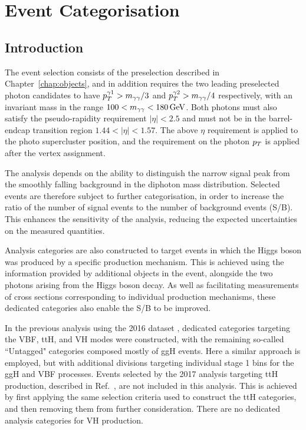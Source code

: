 \chapter{Event Categorisation}
\label{chap:categorisation}

\section{Introduction}

The event selection consists of the preselection described in Chapter~\ref{chap:objects}, 
and in addition requires the two leading preselected photon candidates to have 
$p_T^{\gamma 1} > m_{\gamma\gamma}/3$ and $p_T^{\gamma 2} > m_{\gamma\gamma} /4$ respectively, 
with an invariant mass in the range $100 < m_{\gamma\gamma} < \SI{180}{GeV}$.
Both photons must also satisfy the
pseudo-rapidity requirement $|\eta|<2.5$ and must not be in the barrel-endcap
transition region $1.44 < |\eta| < 1.57$.
The above $\eta$ requirement is applied to the photo supercluster
position, and the requirement on the photon $p_T$ is applied 
after the vertex assignment.

The \Hgg analysis depends on the ability to distinguish the narrow signal peak 
from the smoothly falling background in the diphoton mass distribution.
Selected events are therefore subject to further categorisation, in order to 
increase the ratio of the number of signal events to the number of background events (S/B).
This enhances the sensitivity of the analysis, 
reducing the expected uncertainties on the measured quantities.

Analysis categories are also constructed to target events in which the Higgs boson was 
produced by a specific production mechanism. 
This is achieved using the information provided by additional objects in the event, 
alongside the two photons arising from the Higgs boson decay.
As well as facilitating measurements of cross sections corresponding 
to individual production mechanisms, these dedicated categories also enable the S/B to be improved.

In the previous \Hgg analysis using the 2016 dataset \cite{HIG-16-040}, 
dedicated categories targeting the VBF, ttH, and VH modes were constructed, 
with the remaining so-called ``Untagged" categories composed mostly of ggH events.
Here a similar approach is employed, 
but with additional divisions targeting individual stage 1 bins for the ggH and VBF processes.
Events selected by the 2017 \Hgg analysis targeting ttH production, 
described in Ref.~\cite{HIG-18-018}, are not included in this analysis. 
This is achieved by first applying the same selection criteria used to construct the ttH categories, 
and then removing them from further consideration. 
There are no dedicated analysis categories for VH production.

